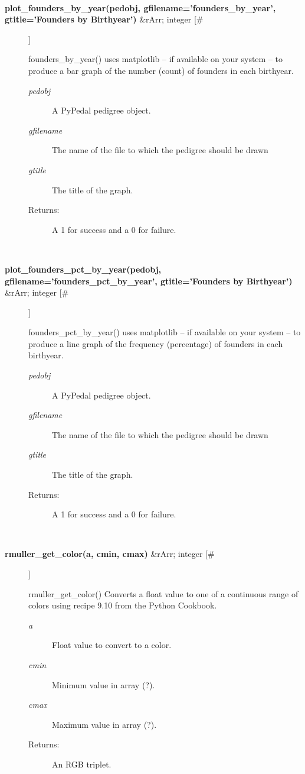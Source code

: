 \documentclass[10pt]{article}
\begin{document}
\begin{description}
\begin{description}
\end{description}
\\ 

\item[\textbf{plot\_founders\_by\_year(pedobj, gfilename='founders\_by\_year', gtitle='Founders by Birthyear')}
 \&rArr; integer [\#]]

 founders\_by\_year() uses matplotlib -- if available on your system -- to produce a bar graph of the number (count) of founders in each birthyear.
\begin{description}
\item[\emph{pedobj}
] A PyPedal pedigree object.
\item[\emph{gfilename}
] The name of the file to which the pedigree should be drawn
\item[\emph{gtitle}
] The title of the graph.
\item[Returns:] A 1 for success and a 0 for failure.

\end{description}
\\ 

\item[\textbf{plot\_founders\_pct\_by\_year(pedobj, gfilename='founders\_pct\_by\_year', gtitle='Founders by Birthyear')}
 \&rArr; integer [\#]]

 founders\_pct\_by\_year() uses matplotlib -- if available on your system -- to produce a line graph of the frequency (percentage) of founders in each birthyear.
\begin{description}
\item[\emph{pedobj}
] A PyPedal pedigree object.
\item[\emph{gfilename}
] The name of the file to which the pedigree should be drawn
\item[\emph{gtitle}
] The title of the graph.
\item[Returns:] A 1 for success and a 0 for failure.

\end{description}
\\ 

\item[\textbf{rmuller\_get\_color(a, cmin, cmax)}
 \&rArr; integer [\#]]

 rmuller\_get\_color() Converts a float value to one of a continuous range of colors using recipe 9.10 from the Python Cookbook.
\begin{description}
\item[\emph{a}
] Float value to convert to a color.
\item[\emph{cmin}
] Minimum value in array (?).
\item[\emph{cmax}
] Maximum value in array (?).
\item[Returns:] An RGB triplet.


\end{description}
\end{description}
\end{document}

